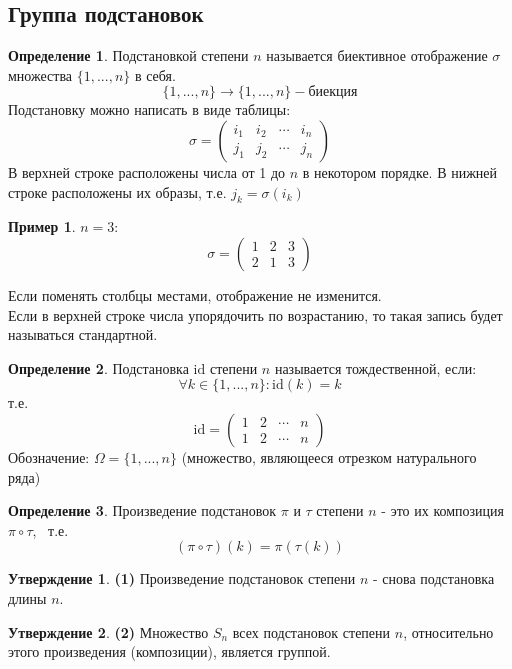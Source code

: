\documentclass[a4paper, 12pt]{article}
\theoremstyle{definition}
\newtheorem*{definition}{Определение}
\newtheorem*{subtheorem}{Утверждение}
\newtheorem*{example1}{Пример}
\begin{document}
  \subsection{Группа подстановок}
  \begin{definition}
    Подстановкой степени $n$ называется биективное отображение $\sigma$ множества $\{1,...,n\}$ в себя. 
    $$\{1,...,n\} \to \{1,...,n\} - \text{биекция}$$  
    Подстановку можно написать в виде таблицы:
    $$\sigma = \begin{pmatrix}
      i_1 & i_2 & \cdots & i_n \\
      j_1 & j_2 & \cdots & j_n
    \end{pmatrix}$$ 
    В верхней строке расположены числа от 1 до $n$ в некотором порядке. В нижней строке расположены их образы, т.е. $j_k = \sigma(i_k)$ 
    \begin{example1}
      $n=3:$ $$\sigma=\begin{pmatrix}
        1 & 2 & 3 \\
        2 & 1 & 3
      \end{pmatrix}$$  
    \end{example1}
    Если поменять столбцы местами, отображение не изменится. \\
    Если в верхней строке числа упорядочить по возрастанию, то такая запись будет называться стандартной.
  \end{definition} 
  \begin{definition}
    Подстановка $\textrm{id}$ степени $n$ называется тождественной, если:
    $$\forall k \in \{1,...,n\}: \textrm{id}(k) = k$$ 
    т.е. $$\textrm{id} = \begin{pmatrix}
      1 & 2 & \cdots & n \\
      1 & 2 & \cdots & n
    \end{pmatrix}$$  
    Обозначение: $\Omega = \{1,...,n\}$ (множество, являющееся отрезком натурального ряда)
  \end{definition} 
  \begin{definition}
    Произведение подстановок $\pi$ и $\tau$ степени $n$ - это их композиция $\pi \circ \tau$, \ т.е. $$(\pi \circ \tau)(k)= \pi(\tau(k))$$  
  \end{definition} 
  \begin{subtheorem}\textbf{(1)} 
    Произведение подстановок степени $n$ - снова подстановка длины $n$. 
  \end{subtheorem} 
  \begin{subtheorem}\textbf{(2)}
    Множество $S_n$ всех подстановок степени $n$, относительно этого произведения (композиции), является группой. 
  \end{subtheorem} 
\end{document}
